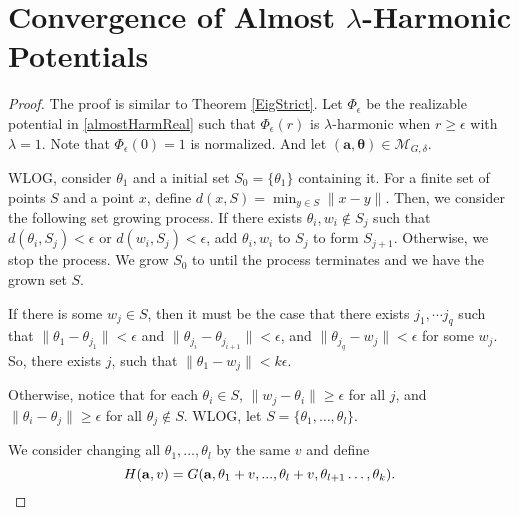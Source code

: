 

\section{Convergence of Almost $\lambda$-Harmonic Potentials}\label{App:EigenFunc}

\almostharmconv*

\begin{proof}
 The proof is similar to Theorem \ref{EigStrict}. Let $\Phi_\epsilon$ be the realizable potential in \ref{almostHarmReal} such that $\Phi_\epsilon(r)$ is $\lambda$-harmonic when $r \geq \epsilon$ with $\lambda = 1$. Note that $\Phi_\epsilon(0) = 1$ is normalized. And let $\boldsymbol{(a,\theta)} \in \mathcal{M}_{G,\delta}$. 
 
WLOG, consider $\theta_1$ and a initial set $S_0 = \{ \theta_1\}$ containing it. For a finite set of points $S$ and a point $x$, define $d(x,S) = \min_{y \in S} \| x - y\|$. Then, we consider the following set growing process. If there exists $\theta_i, w_i \not \in S_j$ such that $d(\theta_i, S_j) < \epsilon$ or $d(w_i, S_j) < \epsilon$, add $\theta_i, w_i$ to $S_j$ to form $S_{j+1}$. Otherwise, we stop the process. We grow $S_0$ to until the process terminates and we have the grown set $S$.

If there is some $w_j \in S$, then it must be the case that there exists ${j_1},\cdots {j_q}$ such that $\|\theta_1 - \theta_{j_1} \| < \epsilon$ and
$\|\theta_{j_{i}} - \theta_{j_{i+1}}\| < \epsilon$, and
$\|\theta_{j_q}- w_j\| <\epsilon$ for some $w_j$. So, there exists $j$, such that $\|\theta_1 - w_j\| < k\epsilon$. 

Otherwise, notice that for each $\theta_i \in S$, $\|w_j - \theta_i\|\geq \epsilon$ for all $j$, and $\|\theta_i - \theta_j\| \geq \epsilon$ for all $\theta_j\not \in S$. WLOG, let $S = \{\theta_1,\dots,\theta_l\}$. 
  
We consider changing all
$\theta_1, \ldots, \theta_{l}$ by the same $v$ and define 
%
\[H({\bf a}, v) = G({\bf a},\theta_1+v,...,\theta_l+v, \theta_{l+1}
\ldots, \theta_k).\]


\end{proof}
